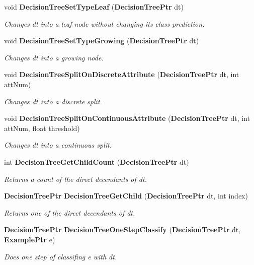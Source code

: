 \begin{CompactItemize}
void {\bf Decision\-Tree\-Set\-Type\-Leaf} ({\bf Decision\-Tree\-Ptr} dt)
\begin{CompactList}\small\item\em Changes dt into a leaf node without changing its class prediction. \item\end{CompactList}\item 
void {\bf Decision\-Tree\-Set\-Type\-Growing} ({\bf Decision\-Tree\-Ptr} dt)
\begin{CompactList}\small\item\em Changes dt into a growing node. \item\end{CompactList}\item 
void {\bf Decision\-Tree\-Split\-On\-Discrete\-Attribute} ({\bf Decision\-Tree\-Ptr} dt, int att\-Num)
\begin{CompactList}\small\item\em Changes dt into a discrete split. \item\end{CompactList}\item 
void {\bf Decision\-Tree\-Split\-On\-Continuous\-Attribute} ({\bf Decision\-Tree\-Ptr} dt, int att\-Num, float threshold)
\begin{CompactList}\small\item\em Changes dt into a continuous split. \item\end{CompactList}\item 
int {\bf Decision\-Tree\-Get\-Child\-Count} ({\bf Decision\-Tree\-Ptr} dt)
\begin{CompactList}\small\item\em Returns a count of the direct decendants of dt. \item\end{CompactList}\item 
{\bf Decision\-Tree\-Ptr} {\bf Decision\-Tree\-Get\-Child} ({\bf Decision\-Tree\-Ptr} dt, int index)
\begin{CompactList}\small\item\em Returns one of the direct decendants of dt. \item\end{CompactList}\item 
{\bf Decision\-Tree\-Ptr} {\bf Decision\-Tree\-One\-Step\-Classify} ({\bf Decision\-Tree\-Ptr} dt, {\bf Example\-Ptr} e)
\begin{CompactList}\small\item\em Does one step of classifing e with dt. \item\end{CompactList}\item 

\end{CompactItemize}
